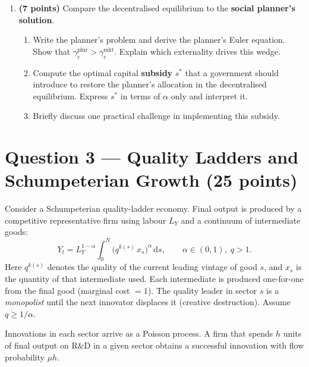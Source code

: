 \documentclass[a4paper,11pt]{article}
\newcommand{\dd}{\mathrm{d}}
\begin{document}
\begin{enumerate}[label=\textbf{\arabic*.}, leftmargin=*, itemsep=6pt]
    \item \textbf{(7 points)} Compare the decentralised equilibrium to the
    \textbf{social planner's solution}.
    \begin{enumerate}[label=(\alph*), itemsep=4pt]
        \item Write the planner's problem and derive the planner's Euler equation.
        Show that $\gamma_c^{\mathrm{plnr}} > \gamma_c^{\mathrm{mkt}}$.  Explain which
        externality drives this wedge.
        \item Compute the optimal capital \textbf{subsidy} $s^*$ that a government should
        introduce to restore the planner's allocation in the decentralised equilibrium.
        Express $s^*$ in terms of $\alpha$ only and interpret it.
        \item Briefly discuss one practical challenge in implementing this subsidy.
    \end{enumerate}

\end{enumerate}

\clearpage

\section{Question 3 --- Quality Ladders and Schumpeterian Growth \hfill (25 points)}

Consider a Schumpeterian quality-ladder economy.  Final output is produced by a competitive
representative firm using labour $L_Y$ and a continuum of intermediate goods:
\[
    Y_t = L_Y^{1-\alpha}\int_0^N \bigl(q^{k(s)}\,x_s\bigr)^{\alpha}\,\dd s, \qquad
    \alpha \in (0,1),\; q > 1.
\]
Here $q^{k(s)}$ denotes the quality of the current leading vintage of good $s$, and $x_s$ is
the quantity of that intermediate used.  Each intermediate is produced one-for-one from the
final good (marginal cost $= 1$).  The quality leader in sector $s$ is a \emph{monopolist}
until the next innovator displaces it (creative destruction).  Assume $q \geq 1/\alpha$.

Innovations in each sector arrive as a Poisson process.  A firm that spends $h$ units of
final output on R\&D in a given sector obtains a successful innovation with flow probability
$\mu h$.
\end{document}
